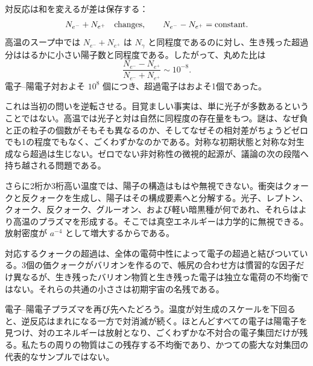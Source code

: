 対反応は和を変えるが差は保存する：
\begin{equation}
N_{e^-}+N_{e^+}\quad\hbox{changes},
\qquad
N_{e^-}-N_{e^+}=\hbox{constant}.
\label{eq:c07-pair-invariants}
\end{equation}
高温のスープ中では \(N_{e^-}+N_{e^+}\) は \(N_\gamma\) と同程度であるのに対し、生き残った超過分ははるかに小さい陽子数と同程度である。したがって、丸めた比は
\begin{equation}
\boxed{
\frac{N_{e^-}-N_{e^+}}
{N_{e^-}+N_{e^+}}
\sim10^{-8}
}.
\label{eq:c07-asymmetry}
\end{equation}
電子--陽電子対およそ \(10^8\) 個につき、超過電子はおよそ1個であった。

これは当初の問いを逆転させる。目覚ましい事実は、単に光子が多数あるということではない。高温では光子と対は自然に同程度の存在量をもつ。謎は、なぜ負と正の粒子の個数がそもそも異なるのか、そしてなぜその相対差がちょうどゼロでも1の程度でもなく、ごくわずかなのかである。対称な初期状態と対称な対生成なら超過は生じない。ゼロでない非対称性の微視的起源が、議論の次の段階へ持ち越される問題である。

さらに2桁か3桁高い温度では、陽子の構造はもはや無視できない。衝突はクォークと反クォークを生成し、陽子はその構成要素へと分解する。光子、レプトン、クォーク、反クォーク、グルーオン、および軽い暗黒種が何であれ、それらはより高温のプラズマを形成する。そこでは真空エネルギーは力学的に無視できる。放射密度が \(a^{-4}\) として増大するからである。

対応するクォークの超過は、全体の電荷中性によって電子の超過と結びついている。3個の価クォークがバリオンを作るので、帳尻の合わせ方は慣習的な因子だけ異なるが、生き残ったバリオン物質と生き残った電子は独立な電荷の不均衡ではない。それらの共通の小ささは初期宇宙の名残である。

電子--陽電子プラズマを再び先へたどろう。温度が対生成のスケールを下回ると、逆反応はまれになる一方で対消滅が続く。ほとんどすべての電子は陽電子を見つけ、対のエネルギーは放射となり、ごくわずかな不対合の電子集団だけが残る。私たちの周りの物質はこの残存する不均衡であり、かつての膨大な対集団の代表的なサンプルではない。

\begin{classroomqa}
\end{classroomqa}

